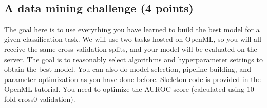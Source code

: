 \documentclass[11pt]{article}
\begin{document}
    \begin{center}
    \end{center}
    { \hspace*{\fill} \\}
    
    \subsection{A data mining challenge (4
points)}\label{a-data-mining-challenge-4-points}

    The goal here is to use everything you have learned to build the best
model for a given classification task. We will use two tasks hosted on
OpenML, so you will all receive the same cross-validation splits, and
your model will be evaluated on the server. The goal is to reasonably
select algorithms and hyperparameter settings to obtain the best model.
You can also do model selection, pipeline building, and parameter
optimization as you have done before. Skeleton code is provided in the
OpenML tutorial. You need to optimize the AUROC score (calculated using
10-fold cross0-validation).
\end{document}
